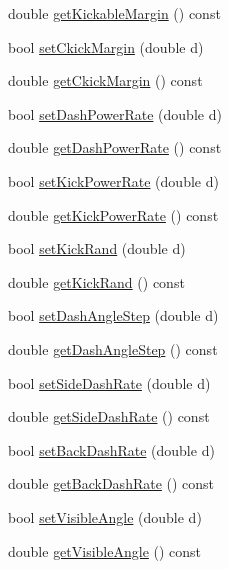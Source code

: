 \begin{DoxyCompactItemize}
\item 
double \hyperlink{classServerSettings_a4c944475bec89b0ee7ce9e4d2a5808c0}{get\+Kickable\+Margin} () const 
\item 
bool \hyperlink{classServerSettings_ade913eaa480cead3e496e71a3d16306f}{set\+Ckick\+Margin} (double d)
\item 
double \hyperlink{classServerSettings_a6ddcd85b5129fe16a90ba057b58ab2b1}{get\+Ckick\+Margin} () const 
\item 
bool \hyperlink{classServerSettings_a5a945e55070c1f4c7da35dfd45c05bd2}{set\+Dash\+Power\+Rate} (double d)
\item 
double \hyperlink{classServerSettings_a8c3bc89b83304d506223bdf2c851bd79}{get\+Dash\+Power\+Rate} () const 
\item 
bool \hyperlink{classServerSettings_a5d62744529556cad4276dbb69201e41d}{set\+Kick\+Power\+Rate} (double d)
\item 
double \hyperlink{classServerSettings_a03ac9cca9b81036b4cb23837b28a769c}{get\+Kick\+Power\+Rate} () const 
\item 
bool \hyperlink{classServerSettings_a985e150cf26c4b3690acc7ba206c2c9d}{set\+Kick\+Rand} (double d)
\item 
double \hyperlink{classServerSettings_a6ca6265443dda845dba70024670f5a13}{get\+Kick\+Rand} () const 
\item 
bool \hyperlink{classServerSettings_a94d90a2134e4b2b01635032f26a47426}{set\+Dash\+Angle\+Step} (double d)
\item 
double \hyperlink{classServerSettings_af39faf06d9286d49b5e2ca5b4c03ca22}{get\+Dash\+Angle\+Step} () const 
\item 
bool \hyperlink{classServerSettings_aa8ce2c74656a92ec980574d42b9d7566}{set\+Side\+Dash\+Rate} (double d)
\item 
double \hyperlink{classServerSettings_aae957bd728dde3310f1de707a33642ec}{get\+Side\+Dash\+Rate} () const 
\item 
bool \hyperlink{classServerSettings_a85c7e2f37dfaab959157fa401ee3c02e}{set\+Back\+Dash\+Rate} (double d)
\item 
double \hyperlink{classServerSettings_adb9445b0fcb6e78ad26878c21a666bc1}{get\+Back\+Dash\+Rate} () const 
\item 
bool \hyperlink{classServerSettings_abecc6c28f66e8973bb7b9673efc2ddee}{set\+Visible\+Angle} (double d)
\item 
double \hyperlink{classServerSettings_a963da1f61fdf8145c3ea4b3790d77405}{get\+Visible\+Angle} () const 
\item 

\end{DoxyCompactItemize}
